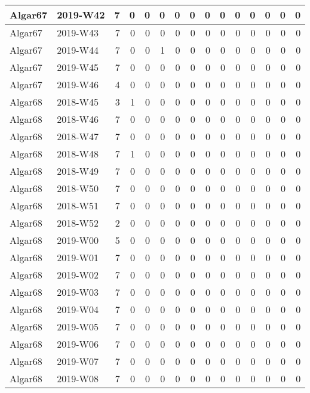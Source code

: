 \documentclass[]{book}
\begin{document}
\begin{table}
\begin{tabular}[t]{l|l|r|r|r|r|r|r|r|r|r|r|r|r|r}
\hline
Algar67 & 2019-W42 & 7 & 0 & 0 & 0 & 0 & 0 & 0 & 0 & 0 & 0 & 0 & 0 & 0\\
\hline
Algar67 & 2019-W43 & 7 & 0 & 0 & 0 & 0 & 0 & 0 & 0 & 0 & 0 & 0 & 0 & 0\\
\hline
Algar67 & 2019-W44 & 7 & 0 & 0 & 1 & 0 & 0 & 0 & 0 & 0 & 0 & 0 & 0 & 0\\
\hline
Algar67 & 2019-W45 & 7 & 0 & 0 & 0 & 0 & 0 & 0 & 0 & 0 & 0 & 0 & 0 & 0\\
\hline
Algar67 & 2019-W46 & 4 & 0 & 0 & 0 & 0 & 0 & 0 & 0 & 0 & 0 & 0 & 0 & 0\\
\hline
Algar68 & 2018-W45 & 3 & 1 & 0 & 0 & 0 & 0 & 0 & 0 & 0 & 0 & 0 & 0 & 0\\
\hline
Algar68 & 2018-W46 & 7 & 0 & 0 & 0 & 0 & 0 & 0 & 0 & 0 & 0 & 0 & 0 & 0\\
\hline
Algar68 & 2018-W47 & 7 & 0 & 0 & 0 & 0 & 0 & 0 & 0 & 0 & 0 & 0 & 0 & 0\\
\hline
Algar68 & 2018-W48 & 7 & 1 & 0 & 0 & 0 & 0 & 0 & 0 & 0 & 0 & 0 & 0 & 0\\
\hline
Algar68 & 2018-W49 & 7 & 0 & 0 & 0 & 0 & 0 & 0 & 0 & 0 & 0 & 0 & 0 & 0\\
\hline
Algar68 & 2018-W50 & 7 & 0 & 0 & 0 & 0 & 0 & 0 & 0 & 0 & 0 & 0 & 0 & 0\\
\hline
Algar68 & 2018-W51 & 7 & 0 & 0 & 0 & 0 & 0 & 0 & 0 & 0 & 0 & 0 & 0 & 0\\
\hline
Algar68 & 2018-W52 & 2 & 0 & 0 & 0 & 0 & 0 & 0 & 0 & 0 & 0 & 0 & 0 & 0\\
\hline
Algar68 & 2019-W00 & 5 & 0 & 0 & 0 & 0 & 0 & 0 & 0 & 0 & 0 & 0 & 0 & 0\\
\hline
Algar68 & 2019-W01 & 7 & 0 & 0 & 0 & 0 & 0 & 0 & 0 & 0 & 0 & 0 & 0 & 0\\
\hline
Algar68 & 2019-W02 & 7 & 0 & 0 & 0 & 0 & 0 & 0 & 0 & 0 & 0 & 0 & 0 & 0\\
\hline
Algar68 & 2019-W03 & 7 & 0 & 0 & 0 & 0 & 0 & 0 & 0 & 0 & 0 & 0 & 0 & 0\\
\hline
Algar68 & 2019-W04 & 7 & 0 & 0 & 0 & 0 & 0 & 0 & 0 & 0 & 0 & 0 & 0 & 0\\
\hline
Algar68 & 2019-W05 & 7 & 0 & 0 & 0 & 0 & 0 & 0 & 0 & 0 & 0 & 0 & 0 & 0\\
\hline
Algar68 & 2019-W06 & 7 & 0 & 0 & 0 & 0 & 0 & 0 & 0 & 0 & 0 & 0 & 0 & 0\\
\hline
Algar68 & 2019-W07 & 7 & 0 & 0 & 0 & 0 & 0 & 0 & 0 & 0 & 0 & 0 & 0 & 0\\
\hline
Algar68 & 2019-W08 & 7 & 0 & 0 & 0 & 0 & 0 & 0 & 0 & 0 & 0 & 0 & 0 & 0\\

\end{tabular}
\end{table}
\end{document}
